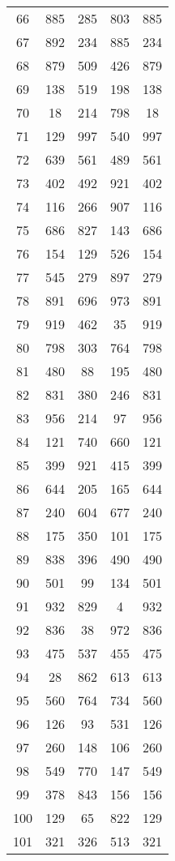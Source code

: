 \documentclass[a4paper,10pt,ngerman]{scrartcl}
\begin{document}
\begin{longtable}[c]{c|c|c|c|c}
    66 & 885 & 285 & 803 & 885 \\
    67 & 892 & 234 & 885 & 234 \\
    68 & 879 & 509 & 426 & 879 \\
    69 & 138 & 519 & 198 & 138 \\
    70 & 18 & 214 & 798 & 18 \\
    71 & 129 & 997 & 540 & 997 \\
    72 & 639 & 561 & 489 & 561 \\
    73 & 402 & 492 & 921 & 402 \\
    74 & 116 & 266 & 907 & 116 \\
    75 & 686 & 827 & 143 & 686 \\
    76 & 154 & 129 & 526 & 154 \\
    77 & 545 & 279 & 897 & 279 \\
    78 & 891 & 696 & 973 & 891 \\
    79 & 919 & 462 & 35 & 919 \\
    80 & 798 & 303 & 764 & 798 \\
    81 & 480 & 88 & 195 & 480 \\
    82 & 831 & 380 & 246 & 831 \\
    83 & 956 & 214 & 97 & 956 \\
    84 & 121 & 740 & 660 & 121 \\
    85 & 399 & 921 & 415 & 399 \\
    86 & 644 & 205 & 165 & 644 \\
    87 & 240 & 604 & 677 & 240 \\
    88 & 175 & 350 & 101 & 175 \\
    89 & 838 & 396 & 490 & 490 \\
    90 & 501 & 99 & 134 & 501 \\
    91 & 932 & 829 & 4 & 932 \\
    92 & 836 & 38 & 972 & 836 \\
    93 & 475 & 537 & 455 & 475 \\
    94 & 28 & 862 & 613 & 613 \\
    95 & 560 & 764 & 734 & 560 \\
    96 & 126 & 93 & 531 & 126 \\
    97 & 260 & 148 & 106 & 260 \\
    98 & 549 & 770 & 147 & 549 \\
    99 & 378 & 843 & 156 & 156 \\
    100 & 129 & 65 & 822 & 129 \\
    101 & 321 & 326 & 513 & 321 \\

\end{longtable}
\end{document}
